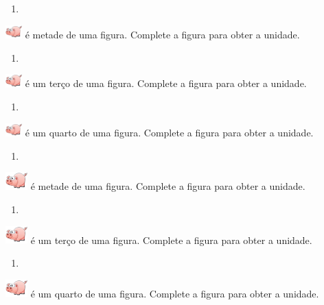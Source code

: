 \documentclass[a4,12pt]{book}
\begin{document}
\begin{enumerate} [\quad a)] %
  \item
\end{enumerate} %
\includegraphics[width=18pt, keepaspectratio]{pig} é metade de uma figura. Complete a figura para obter a unidade.
\begin{enumerate} [\quad a)] %
  \item
\end{enumerate} %
\includegraphics[width=18pt, keepaspectratio]{pig} é um terço de uma figura. Complete a figura para obter a unidade.
\begin{enumerate} [\quad a)] %
  \item
\end{enumerate} %
\includegraphics[width=18pt, keepaspectratio]{pig} é um quarto de uma figura. Complete a figura para obter a unidade.
\begin{enumerate} [\quad a)] %
  \item
\end{enumerate} %
\includegraphics[width=24pt, keepaspectratio]{pig} é metade de uma figura. Complete a figura para obter a unidade.
\begin{enumerate} [\quad a)] %
  \item
\end{enumerate} %
\includegraphics[width=24pt, keepaspectratio]{pig} é um terço de uma figura. Complete a figura para obter a unidade.
\begin{enumerate} [\quad a)] %
  \item
\end{enumerate} %
\includegraphics[width=24pt, keepaspectratio]{pig} é um quarto de uma figura. Complete a figura para obter a unidade.
\end{document}
